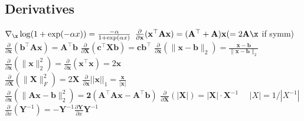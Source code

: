 \subsection*{Derivatives}
$\nabla_\x\log(1+\exp(-\alpha x))=\frac{-\alpha}{1+\exp(\alpha x)}$
$\frac{\partial}{\partial \mathbf{x}}(\mathbf{x}^\top \mathbf{A}\mathbf{x}) = (\mathbf{A}^\top + \mathbf{A})\mathbf{x} (= 2\mathbf{A}\x$ if symm) \quad\\
$\frac{\partial}{\partial \mathbf{x}}(\mathbf{b}^\top \mathbf{A}\mathbf{x}) = \mathbf{A}^\top \mathbf{b}$ \quad
$\frac{\partial}{\partial \mathbf{X}}(\mathbf{c}^\top \mathbf{X} \mathbf{b}) = \mathbf{c}\mathbf{b}^\top$ \quad
$\frac{\partial}{\partial \mathbf{x}}(\| \mathbf{x}-\mathbf{b} \|_2) = \frac{\mathbf{x}-\mathbf{b}}{\|\mathbf{x}-\mathbf{b}\|_2}$ \\
$\frac{\partial}{\partial \mathbf{x}}(\|\mathbf{x}\|^2_2) = \frac{\partial}{\partial \mathbf{x}} (\mathbf{x}^\top \mathbf{x}) = 2\mathbf{x}$ \quad
\\$\frac{\partial}{\partial \mathbf{X}}(\|\mathbf{X}\|_F^2) = 2\mathbf{X}$  \quad \quad
$\frac{\partial}{\partial \mathbf{x}}||\mathbf{x}||_1 = \frac{\mathbf{x}}{|\mathbf{x}|}$ \\
$\frac{\partial}{\partial \mathbf{x}}(\|\mathbf{Ax - b}\|_2^2) = \mathbf{2(A^\top Ax-A^\top b)}$ \quad
$\frac{\partial}{\partial \mathbf{X}}(|\mathbf{X}|) = |\mathbf{X}|\cdot \mathbf{X}^{-1}$ $\quad |X| = 1 / |X^{-1}|$\\
$\frac{\partial}{\partial x}(\mathbf{Y}^{-1}) = -\mathbf{Y}^{-1} \frac{\partial\mathbf{Y}}{\partial x} \mathbf{Y}^{-1}$

\iffalse
\subsection*{Parametric vs. Nonparametric}
\textbf{Parametric}: have finite set of parameters. 
e.g. linear regression, linear perceptron\\
\textbf{Nonparametric}: grow in complexity with the size of the data, more expressive.
e.g. k-NN
\fi


